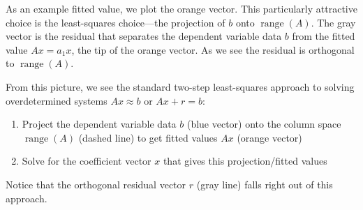 \documentclass[12pt]{article}
\numberwithin{equation}{section} %
\theoremstyle{plain}
\theoremstyle{definition}
\theoremstyle{remark}
\newcommand{\range}{\operatorname{range}}
\begin{document}
As an example fitted value, we plot the orange vector.
This particularly attractive choice is the least-squares choice---the
projection of $b$ onto $\range(A)$. The gray vector is the residual that
separates the dependent variable data $b$ from the fitted value
$Ax=a_1x$, the tip of the orange vector. As we see the
residual is orthogonal to $\range(A)$.

\begin{figure}[htbp!]
\centering
{}
\end{figure}

From this picture, we see the standard two-step least-squares approach
to solving overdetermined systems $Ax\approx b$ or $Ax+r=b$:
\begin{enumerate}[label=(\roman*)]
  \item Project the dependent variable data $b$ (blue vector) onto the
    column space $\range(A)$ (dashed line) to get fitted values $Ax$
    (orange vector)
  \item Solve for the coefficient vector $x$ that gives this
    projection/fitted values
\end{enumerate}
Notice that the orthogonal residual vector $r$ (gray line) falls right
out of this approach.
\end{document}
